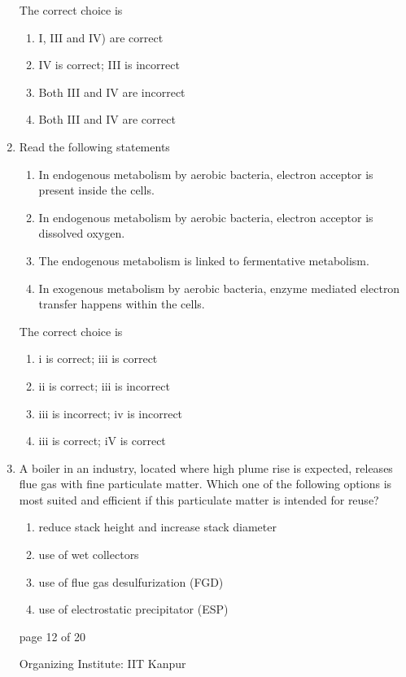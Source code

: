 \documentclass[journal,12pt,onecolumn]{IEEEtran}
\theoremstyle{remark}
\begin{document}
\begin{enumerate}[start=1, label={Q\arabic*.}]
The correct choice is
\begin{enumerate}[label=(\Alph*)]
\item I, III and IV) are correct
\item IV is correct; III is incorrect
\item Both III and IV are incorrect
\item Both III and IV are correct
\end{enumerate}
\hfill{}
\item Read the following statements
\begin{enumerate}[label=\roman*)]
\item In endogenous metabolism by aerobic bacteria, electron acceptor is present inside the cells.
\item In endogenous metabolism by aerobic bacteria, electron acceptor is dissolved oxygen.
\item The endogenous metabolism is linked to fermentative metabolism.
\item In exogenous metabolism by aerobic bacteria, enzyme mediated electron transfer happens within the cells.
\end{enumerate}

The correct choice is
\begin{enumerate}[label=(\Alph*)]
\item i is correct; iii is correct
\item ii is correct; iii is incorrect
\item iii is incorrect; iv is incorrect
\item iii is correct; iV is correct
\end{enumerate}
\hfill{}

\item A boiler in an industry, located where high plume rise is expected, releases flue gas with fine particulate matter. Which one of the following options is most suited and efficient if this particulate matter is intended for reuse?
\begin{enumerate}[label=(\Alph*)]
\item reduce stack height and increase stack diameter
\item use of wet collectors
\item use of flue gas desulfurization (FGD)
\item use of electrostatic precipitator (ESP)
\end{enumerate}
\hfill{}
\vfill
\begin{center}
{\Large page 12 of 20}
\end{center}
\RaggedRight
{\color{orange}
{\Large Organizing Institute: IIT Kanpur}}
\newpage
\begin{figure}
    

\end{figure}
\end{enumerate}
\end{document}
